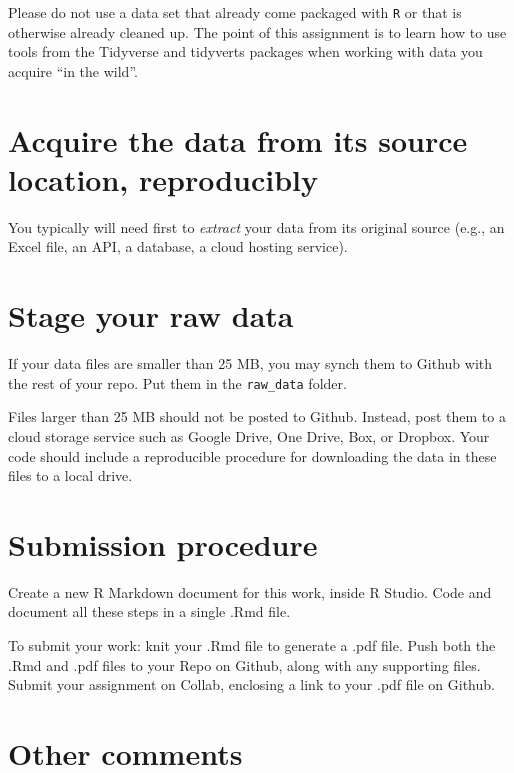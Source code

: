\documentclass[
]{book}
\begin{document}
Please do not use a data set that already come packaged with \texttt{R} or that is otherwise already cleaned up. The point of this assignment is to learn how to use tools from the Tidyverse and tidyverts packages when working with data you acquire ``in the wild''.

\hypertarget{acquire-the-data-from-its-source-location-reproducibly}{%
\section{Acquire the data from its source location, reproducibly}\label{acquire-the-data-from-its-source-location-reproducibly}}

You typically will need first to \emph{extract} your data from its original source (e.g., an Excel file, an API, a database, a cloud hosting service).

\hypertarget{stage-your-raw-data}{%
\section{Stage your raw data}\label{stage-your-raw-data}}

If your data files are smaller than 25 MB, you may synch them to Github with the rest of your repo. Put them in the \texttt{raw\_data} folder.

Files larger than 25 MB should not be posted to Github. Instead, post them to a cloud storage service such as Google Drive, One Drive, Box, or Dropbox. Your code should include a reproducible procedure for downloading the data in these files to a local drive.

\hypertarget{submission-procedure-1}{%
\section{Submission procedure}\label{submission-procedure-1}}

Create a new R Markdown document for this work, inside R Studio. Code and document all these steps in a single .Rmd file.

To submit your work: knit your .Rmd file to generate a .pdf file. Push both the .Rmd and .pdf files to your Repo on Github, along with any supporting files. Submit your assignment on Collab, enclosing a link to your .pdf file on Github.

\hypertarget{other-comments-1}{%
\section{Other comments}\label{other-comments-1}}
\end{document}
